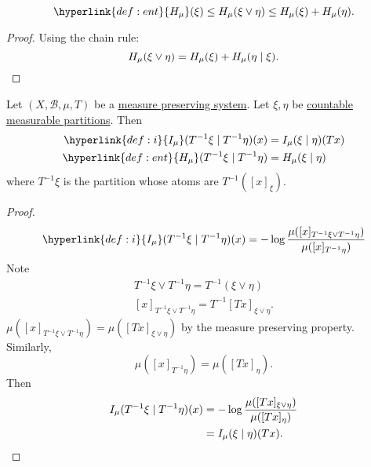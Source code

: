 \documentclass{article}
\begin{document}
\begin{cor}
  \begin{equation*}
    \hyperlink{def:ent}{H_\mu}(\xi) \leq H_\mu(\xi \vee \eta) \leq H_\mu(\xi) + H_\mu(\eta).
  \end{equation*}
\end{cor}
\begin{proof}
  Using the chain rule:
  \begin{equation*}
    H_\mu(\xi \vee \eta) = H_\mu(\xi) + H_\mu(\eta \mid \xi). \qedhere
  \end{equation*}
\end{proof}
\begin{lemma}
  Let $(X, \mathcal{B}, \mu, T)$ be a \hyperlink{def:mps}{measure preserving system}.
  Let $\xi, \eta$ be \hyperlink{def:partition}{countable measurable partitions}.
  Then
  \begin{align*}
    \hyperlink{def:i}{I_\mu}(T^{-1} \xi \mid T^{-1} \eta)(x) &= I_\mu(\xi \mid \eta)(Tx) \\
    \hyperlink{def:ent}{H_\mu}(T^{-1} \xi \mid T^{-1} \eta) &= H_\mu(\xi \mid \eta)
  \end{align*}
  where $T^{-1} \xi$ is the partition whose atoms are $T^{-1}([x]_\xi)$.
\end{lemma}
\begin{proof}
  \begin{equation*}
    \hyperlink{def:i}{I_\mu}(T^{-1} \xi \mid T^{-1} \eta) (x) =  -\log \frac{\mu([x]_{T^{-1} \xi \vee T^{-1} \eta})}{\mu([x]_{T^{-1} \eta})}
  \end{equation*}
  Note
  \begin{align*} T^{-1}\xi \vee T^{-1} \eta = T^{-1} (\xi \vee \eta)  \\ [x]_{T^{-1} \xi \vee T^{-1} \eta} = T^{-1} [Tx]_{\xi \vee \eta}.\end{align*}
  $\mu([x]_{T^{-1} \xi \vee T^{-1} \eta}) = \mu([Tx]_{\xi \vee \eta})$ by the measure preserving property.
  Similarly,
  \begin{equation*}
    \mu([x]_{T^{-1} \eta}) = \mu([Tx]_\eta).
  \end{equation*}
  Then
  \begin{align*}
    I_\mu(T^{-1} \xi \mid T^{-1} \eta)(x) &= -\log \frac{\mu([Tx]_{\xi \vee \eta})}{\mu([Tx]_\eta)} \\
                                          &= I_\mu(\xi \mid \eta)(Tx). \qedhere
  \end{align*}
\end{proof}
\end{document}
